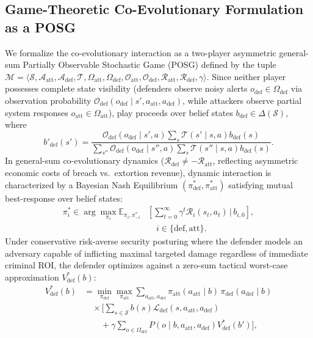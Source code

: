 \documentclass[conference,10pt,twocolumn,a4paper]{IEEEtran}
\begin{document}
\subsection{Game-Theoretic Co-Evolutionary Formulation as a POSG}
We formalize the co-evolutionary interaction as a two-player asymmetric general-sum Partially Observable Stochastic Game (POSG) defined by the tuple $\mathcal{M} = \langle \mathcal{S}, \mathcal{A}_{\mathrm{att}}, \mathcal{A}_{\mathrm{def}}, \mathcal{T}, \Omega_{\mathrm{att}}, \Omega_{\mathrm{def}}, \mathcal{O}_{\mathrm{att}}, \mathcal{O}_{\mathrm{def}}, \mathcal{R}_{\mathrm{att}}, \mathcal{R}_{\mathrm{def}}, \gamma \rangle$. Since neither player possesses complete state visibility (defenders observe noisy alerts $o_{\mathrm{def}} \in \Omega_{\mathrm{def}}$ via observation probability $\mathcal{O}_{\mathrm{def}}(o_{\mathrm{def}} \mid s', a_{\mathrm{att}}, a_{\mathrm{def}})$, while attackers observe partial system responses $o_{\mathrm{att}} \in \Omega_{\mathrm{att}}$), play proceeds over belief states $b_{\mathrm{def}} \in \Delta(\mathcal{S})$, where
\begin{equation}
b'_{\mathrm{def}}(s') = \frac{\mathcal{O}_{\mathrm{def}}(o_{\mathrm{def}} \mid s', a) \sum_{s} \mathcal{T}(s' \mid s, a) b_{\mathrm{def}}(s)}{\sum_{s''} \mathcal{O}_{\mathrm{def}}(o_{\mathrm{def}} \mid s'', a) \sum_{s} \mathcal{T}(s'' \mid s, a) b_{\mathrm{def}}(s)}.
\end{equation}
In general-sum co-evolutionary dynamics ($\mathcal{R}_{\mathrm{def}} \ne -\mathcal{R}_{\mathrm{att}}$, reflecting asymmetric economic costs of breach vs.\ extortion revenue), dynamic interaction is characterized by a Bayesian Nash Equilibrium $(\pi^*_{\mathrm{def}}, \pi^*_{\mathrm{att}})$ satisfying mutual best-response over belief states:
\begin{equation}
\begin{aligned}
\pi^*_i \in \arg\max_{\pi_i} \mathbb{E}_{\pi_i, \pi^*_{-i}} &\left[ \sum_{t=0}^{\infty} \gamma^t \mathcal{R}_i(s_t, a_t) \,\Big|\, b_{i,0} \right], \\
&\quad i \in \{\mathrm{def}, \mathrm{att}\}.
\end{aligned}
\end{equation}
Under conservative risk-averse security posturing where the defender models an adversary capable of inflicting maximal targeted damage regardless of immediate criminal ROI, the defender optimizes against a zero-sum tactical worst-case approximation $V_{\mathrm{def}}^{*}(b)$:
\begin{equation}
\begin{aligned}
V_{\mathrm{def}}^{*}(b) &= \min_{\pi_{\mathrm{def}}} \max_{\pi_{\mathrm{att}}} \sum_{a_{\mathrm{att}}, a_{\mathrm{def}}} \pi_{\mathrm{att}}(a_{\mathrm{att}}\mid b)\, \pi_{\mathrm{def}}(a_{\mathrm{def}}\mid b) \\
&\quad \times \Big[ \sum_{s \in \mathcal{S}} b(s) \mathcal{L}_{\mathrm{def}}(s, a_{\mathrm{att}}, a_{\mathrm{def}}) \\
&\quad\quad + \gamma \sum_{o \in \Omega_{\mathrm{def}}} P(o \mid b, a_{\mathrm{att}}, a_{\mathrm{def}}) V_{\mathrm{def}}^{*}(b') \Big],
\end{aligned}
\end{equation}
\end{document}
